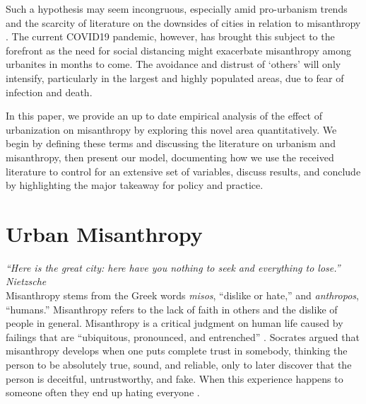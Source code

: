 \documentclass[11pt, letterpaper]{article}
\begin{document}
\begin{spacing}{1.4}
Such a hypothesis may seem incongruous, especially amid pro-urbanism trends and the scarcity of literature on the downsides of cities in relation to misanthropy \citep{thrift05,amin06,aokCityBook15}. The current COVID19 pandemic, however, has brought this subject to the forefront as the need for social distancing might exacerbate misanthropy among urbanites in months to come. The avoidance and distrust of `others' will only intensify, particularly in the largest and highly populated areas, due to fear of infection and death.
 
In this paper, we provide an up to date empirical analysis of the effect of urbanization on misanthropy by exploring this novel area quantitatively. We begin by defining these terms and discussing the literature on urbanism and misanthropy, then present our model, documenting how we use the received literature to control for an extensive set of variables, discuss results, and conclude by highlighting the major takeaway for policy and practice.   

   
\section*{Urban Misanthropy}

{\small\it \noindent ``Here is the great city: here have you nothing to seek and everything to lose.'' Nietzsche}\\

Misanthropy stems from the Greek words \textit{misos}, ``dislike or hate,'' and
\textit{anthropos}, ``humans.''  Misanthropy refers to the lack of faith in others and the dislike of people in general.
%
Misanthropy is a critical judgment on human life caused by failings that are ``ubiquitous, pronounced, and entrenched'' \citep[p. 7]{cooper2018animals}. Socrates argued that misanthropy develops when one puts complete trust in somebody, thinking the person to be absolutely true, sound, and reliable, only to later discover that the person is deceitful, untrustworthy, and fake. When this experience happens to someone often they end up hating everyone \citep[cited in][]{melgar13}.


\end{spacing}
\end{document}
